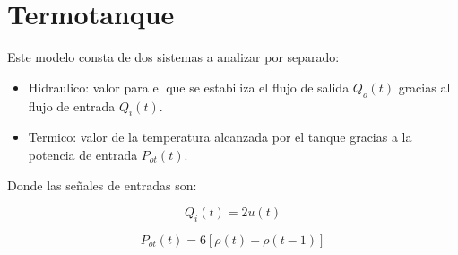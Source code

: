 \documentclass[a4paper,12pt]{article}
\begin{document}







\newpage





\section{Termotanque}

Este modelo consta de dos sistemas a analizar por separado:
\begin{itemize}
\item Hidraulico: valor para el que se estabiliza el flujo de salida $Q_{o}(t)$ gracias al flujo de entrada $Q_{i}(t)$. 
\item  Termico: valor de la temperatura alcanzada por el tanque gracias a la potencia de entrada $P_{ot}(t)$.
\end{itemize}
Donde las señales de entradas son:\par
\begin{center}

\begin{equation}
Q_{i}(t)=2u(t)
\end{equation}\par
\begin{equation}
P_{ot}(t)=6[\rho(t)-\rho(t-1)]
\end{equation}
\end{center}
\end{document}
